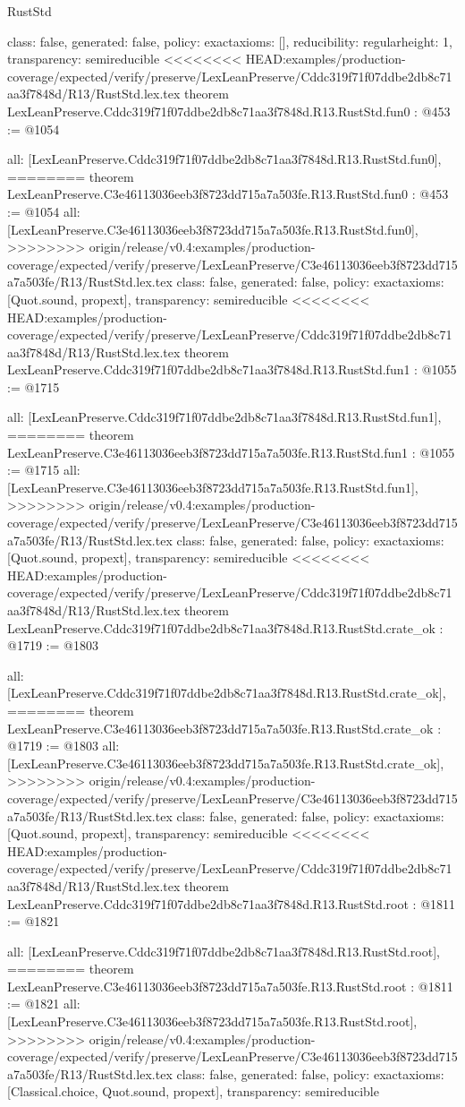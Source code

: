 \begin{lexlean}{RustStd}
\begin{coremodule}
{\begin{coremodule}
{{{  class: false,
  generated: false,
  policy: exact{axioms: []},
  reducibility: regular{height: 1},
  transparency: semireducible
}
<<<<<<<< HEAD:examples/production-coverage/expected/verify/preserve/LexLeanPreserve/Cddc319f71f07ddbe2db8c71aa3f7848d/R13/RustStd.lex.tex
theorem LexLeanPreserve.Cddc319f71f07ddbe2db8c71aa3f7848d.R13.RustStd.fun0 : @453 := @1054 {
  all: [LexLeanPreserve.Cddc319f71f07ddbe2db8c71aa3f7848d.R13.RustStd.fun0],
========
theorem LexLeanPreserve.C3e46113036eeb3f8723dd715a7a503fe.R13.RustStd.fun0 : @453 := @1054 {
  all: [LexLeanPreserve.C3e46113036eeb3f8723dd715a7a503fe.R13.RustStd.fun0],
>>>>>>>> origin/release/v0.4:examples/production-coverage/expected/verify/preserve/LexLeanPreserve/C3e46113036eeb3f8723dd715a7a503fe/R13/RustStd.lex.tex
  class: false,
  generated: false,
  policy: exact{axioms: [Quot.sound, propext]},
  transparency: semireducible
}
<<<<<<<< HEAD:examples/production-coverage/expected/verify/preserve/LexLeanPreserve/Cddc319f71f07ddbe2db8c71aa3f7848d/R13/RustStd.lex.tex
theorem LexLeanPreserve.Cddc319f71f07ddbe2db8c71aa3f7848d.R13.RustStd.fun1 : @1055 := @1715 {
  all: [LexLeanPreserve.Cddc319f71f07ddbe2db8c71aa3f7848d.R13.RustStd.fun1],
========
theorem LexLeanPreserve.C3e46113036eeb3f8723dd715a7a503fe.R13.RustStd.fun1 : @1055 := @1715 {
  all: [LexLeanPreserve.C3e46113036eeb3f8723dd715a7a503fe.R13.RustStd.fun1],
>>>>>>>> origin/release/v0.4:examples/production-coverage/expected/verify/preserve/LexLeanPreserve/C3e46113036eeb3f8723dd715a7a503fe/R13/RustStd.lex.tex
  class: false,
  generated: false,
  policy: exact{axioms: [Quot.sound, propext]},
  transparency: semireducible
}
<<<<<<<< HEAD:examples/production-coverage/expected/verify/preserve/LexLeanPreserve/Cddc319f71f07ddbe2db8c71aa3f7848d/R13/RustStd.lex.tex
theorem LexLeanPreserve.Cddc319f71f07ddbe2db8c71aa3f7848d.R13.RustStd.crate_ok : @1719 := @1803 {
  all: [LexLeanPreserve.Cddc319f71f07ddbe2db8c71aa3f7848d.R13.RustStd.crate_ok],
========
theorem LexLeanPreserve.C3e46113036eeb3f8723dd715a7a503fe.R13.RustStd.crate_ok : @1719 := @1803 {
  all: [LexLeanPreserve.C3e46113036eeb3f8723dd715a7a503fe.R13.RustStd.crate_ok],
>>>>>>>> origin/release/v0.4:examples/production-coverage/expected/verify/preserve/LexLeanPreserve/C3e46113036eeb3f8723dd715a7a503fe/R13/RustStd.lex.tex
  class: false,
  generated: false,
  policy: exact{axioms: [Quot.sound, propext]},
  transparency: semireducible
}
<<<<<<<< HEAD:examples/production-coverage/expected/verify/preserve/LexLeanPreserve/Cddc319f71f07ddbe2db8c71aa3f7848d/R13/RustStd.lex.tex
theorem LexLeanPreserve.Cddc319f71f07ddbe2db8c71aa3f7848d.R13.RustStd.root : @1811 := @1821 {
  all: [LexLeanPreserve.Cddc319f71f07ddbe2db8c71aa3f7848d.R13.RustStd.root],
========
theorem LexLeanPreserve.C3e46113036eeb3f8723dd715a7a503fe.R13.RustStd.root : @1811 := @1821 {
  all: [LexLeanPreserve.C3e46113036eeb3f8723dd715a7a503fe.R13.RustStd.root],
>>>>>>>> origin/release/v0.4:examples/production-coverage/expected/verify/preserve/LexLeanPreserve/C3e46113036eeb3f8723dd715a7a503fe/R13/RustStd.lex.tex
  class: false,
  generated: false,
  policy: exact{axioms: [Classical.choice, Quot.sound, propext]},
  transparency: semireducible
}

}}}}}}
\end{coremodule}}
\end{coremodule}
\end{lexlean}
